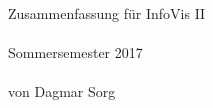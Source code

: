\begin{titlepage}
	\phantom{text}\vfill
	\begin{center}
		\Huge{Zusammenfassung für InfoVis II}\\\ \\
		\Large{Sommersemester 2017}\\\ \\
		\large{von Dagmar Sorg}
	\end{center}
	\vfill	\phantom{text}
	\end{titlepage}